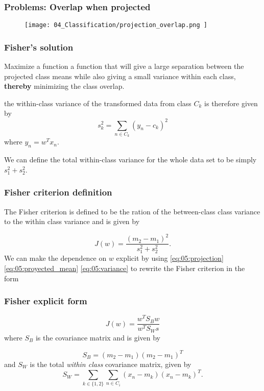 \begin{frame}
    \frametitle{Problems: Overlap when projected}
\begin{figure}[t]
    \texttt{[image: 
        04\_Classification/projection\_overlap.png
    ]}
    \centering
\end{figure}

\end{frame}

\begin{frame}
    \frametitle{Fisher's solution}

    Maximize a function a function that will give a large separation between the projected
    class means while also giving a small variance within each class, \textbf{thereby} minimizing the class overlap. 

    the within-class variance of the transformed data
    from class $C_k$ is therefore given by
    \begin{equation}\label{eq:05:variance}
        s_k^2
        = 
        \sum_{n \in C_k}
        \left(
            y_n - c_k
        \right)^2
    \end{equation}
    where $y_n = w^T x_n$.

    We can define the total within-class variance for the whole data set to be simply $s_1^2 + s_2^2$. 
\end{frame}

\begin{frame}
    \frametitle{Fisher criterion definition }

    The Fisher criterion is defined to be the ration 
    of the between-class class variance to the 
    within class variance and is given by 

    \begin{equation}
        J(w)
        = 
        \frac{
            (m_2 - m_1)^2
        }{
            s_1^2 + s_2^2
        }.
    \end{equation}
    We can make the dependence on $w$ 
    explicit by using
    \ref{eq:05:projection}
    \ref{eq:05:proyected_mean}
    \ref{eq:05:variance}
    to rewrite the Fisher criterion in the form
\end{frame}

\begin{frame}
    \frametitle{Fisher explicit form}

    
    \begin{equation}\label{eq:05:explicit}
        J(w)
        = 
        \frac{w^T S_B w}{w^T S_W s}
    \end{equation}
    where $S_B$ is the  covariance matrix and is given by 

    \begin{equation}\label{05:within-class-covariance}
        S_B = 
        (m_2 - m_1)
        (m_2 - m_1)^T
    \end{equation}
    and $S_W$ is the total \textit{within class} covariance matrix, given by
    \begin{equation}
        S_W
        = 
        \sum_{k \in \{1,2\}}
        \sum_{n \in C_i}
            (x_n - m_k)
            (x_n - m_k)^T.
    \end{equation}
\end{frame}


